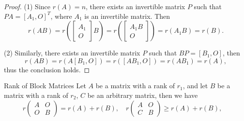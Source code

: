 \begin{proof}
  (1) Since $r(A) = n$, there exists an invertible matrix $P$ such that $PA =
  [A_1, O]^T$, where $A_1$ is an invertible matrix.
  Then
  \begin{equation}
    r(AB) = r \left(
      \begin{bmatrix}
        A_1\\
        O
      \end{bmatrix}B
    \right)
    = r\left(
      \begin{bmatrix}
        A_1 B\\
        O
      \end{bmatrix}
    \right) = r(A_1B) = r(B).
  \end{equation}

  (2) Similarly, there exists an invertible matrix $P$ such that $BP = [B_1, O]$,
  then
  \begin{equation}
    r(AB) = r(A [B_1, O]) = r([AB_1, O]) = r(AB_1) = r(A),
  \end{equation}
  thus the conclusion holds.
\end{proof}

\begin{lemma}{Rank of Block Matrices}{}
  Let $A$ be a matrix with a rank of $r_1$,
  and let $B$ be a matrix with a rank of $r_2$,
  $C$ be an arbitrary matrix,
  then we have
  \begin{equation}
   r\begin{pmatrix}A&O\\O&B\end{pmatrix}=r(A)+r(B), \quad
   r\begin{pmatrix}A&O\\C&B\end{pmatrix}\geq r(A)+r(B), \quad
  \end{equation}
\end{lemma}

